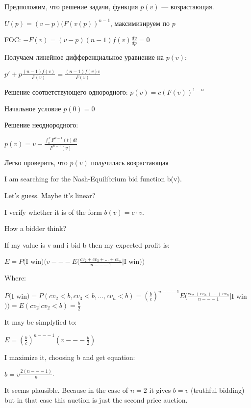\begin{solution}{5.21}

Предположим, что решение задачи, функция $p(v)$ --- возрастающая. \par
$U(p)=(v-p)(F(v(p))^{n-1}$, максимизируем по $p$ \par
FOC: $-F(v)=(v-p)(n-1)f(v)\frac{dv}{dp}=0$ \par
Получаем линейное дифференциальное уравнение на $p(v)$: \par
$p'+p\frac{(n-1)f(v)}{F(v)}=\frac{(n-1)f(v)v}{F(v)}$ \par
Решение соответствующего однородного: $p(v)=c(F(v))^{1-n}$ \par
Начальное условие $p(0)=0$ \par
Решение неоднородного: \par
$p(v)=v-\frac{\int_{0}^{v}F^{n-1}(t)dt}{F^{n-1}(v)}$ \par
Легко проверить, что $p(v)$ получилась возрастающая
\end{solution}
\begin{solution}{5.22}

I am searching for the Nash-Equilibrium bid function b(v).

Let's guess. Maybe it's linear? \par
I verify whether it is of the form $b(v) = c\cdot v$. \par
How a bidder think? \par

If my value is v and i bid b then my expected profit is:\par
$E = P($I win$)(v --- E(\frac {cv_{2} + cv_{3} + \ldots + cv_{n}}{n --- 1}|$I win$))$ \par
Where:\par
$P($I win$)=P(cv_{2} < b,cv_{3} < b,\ldots,cv_{n} < b)=\left(\frac {b}{c}\right)^{n --- 1}
E(\frac {cv_{2} + cv_{3} + \ldots + cv_{n}}{n --- 1}|$I win$))=E(cv_{2}|cv_{2}<b)=\frac{b}{2}$\par
It may be simplyfied to:\par
$E = \left(\frac {b}{c}\right)^{n --- 1}(v --- \frac {b}{2})$\par
I maximize it, choosing b and get equation: \par
$b = v\frac {2(n --- 1)}{n}$. \par

It seems plausible. Because in the case of $n = 2$ it gives $b = v$ (truthful bidding) but in that case this auction is just the second price auction.
\end{solution}
